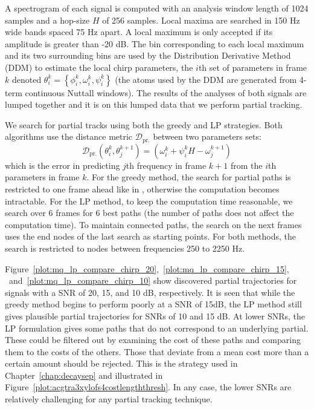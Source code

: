 \documentclass{article}
\begin{document}
\begin{sloppy}
A spectrogram of each signal is computed with an analysis window length of 1024
samples and a hop-size $H$ of 256 samples. Local maxima are searched in 150 Hz
wide bands spaced 75 Hz apart. A local maximum is only accepted if its amplitude
is greater than -20 dB. The bin corresponding to each local maximum and its two
surrounding bins are used by the Distribution Derivative Method
(DDM) to estimate the
local chirp parameters, the $i$th set of parameters in frame $k$ denoted
$\theta_{i}^{k} = \left\{ \phi_{i}^{k} , \omega_{i}^{k} , \psi_{i}^{k}
\right\}$ (the atoms used by the DDM are generated from 4-term continuous
Nuttall windows). The results of the analyses of both signals are lumped together and
it is on this lumped data that we perform partial tracking.

We search for partial tracks using both the greedy and LP strategies. Both
algorithms use the distance metric $\mathcal{D}_{\text{pr.}}$ between two parameters sets:
\[
    \mathcal{D}_{\text{pr.}} \left( \theta_{i}^{k},
    \theta_{j}^{k+1} \right) = \left( \omega_{i}^{k} +
    \psi_{i}^{k} H - \omega_{j}^{k+1} \right)
\]
which is the error in predicting $j$th frequency in frame $k+1$ from the $i$th
parameters in frame $k$. For the greedy method, the search for partial paths is
restricted to one frame ahead like in \cite{mcaulay1986speech}, otherwise the
computation becomes intractable. For the LP
method, to keep the computation time reasonable, we search over 6 frames for 6
best paths (the number of paths does not affect the computation time).
To maintain connected paths, the search on the next frames uses the end nodes of
the last search as starting points. For both methods, the search is restricted
to nodes between frequencies 250 to 2250 Hz.

Figure~\ref{plot:mq_lp_compare_chirp_20},~\ref{plot:mq_lp_compare_chirp_15},%
~and~\ref{plot:mq_lp_compare_chirp_10}
show discovered partial trajectories for signals with a SNR of 20, 15, and 10
dB,
respectively. It is seen that while the greedy method begins to perform poorly
at a SNR of 15dB, the LP method still gives plausible partial trajectories for
SNRs of 10 and 15 dB. At lower SNRs, the LP formulation gives
some paths that do not correspond to an underlying partial. These could be filtered
out by examining the cost of these paths and comparing them to the costs of the
others. Those that deviate from a mean cost more than a certain amount should be
rejected. This is the strategy used in Chapter~\ref{chap:decaysep} and
illustrated in Figure~\ref{plot:acgtra3xylofs4costlengththresh}. In any case,
the lower SNRs are relatively challenging for any partial tracking technique.


\end{sloppy}
\end{document}
